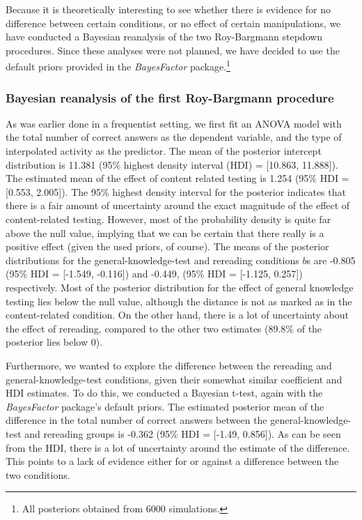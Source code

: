 \documentclass[11pt,]{article}
\let\rmarkdownfootnote\footnote%
\def\footnote{\protect\rmarkdownfootnote}
\begin{document}
Because it is theoretically interesting to see whether there is evidence
for no difference between certain conditions, or no effect of certain
manipulations, we have conducted a Bayesian reanalysis of the two
Roy-Bargmann stepdown procedures. Since these analyses were not planned,
we have decided to use the default priors provided in the
\textit{BayesFactor} \citep{moreyBayesFactorComputationBayes2018}
package.\footnote{All posteriors obtained from 6000 simulations.}

\hypertarget{bayesian-reanalysis-of-the-first-roy-bargmann-procedure}{%
\subsubsection{Bayesian reanalysis of the first Roy-Bargmann
procedure}\label{bayesian-reanalysis-of-the-first-roy-bargmann-procedure}}

As was earlier done in a frequentist setting, we first fit an ANOVA
model with the total number of correct answers as the dependent
variable, and the type of interpolated activity as the predictor. The
mean of the posterior intercept distribution is 11.381 (95\% highest
density interval (HDI) = {[}10.863, 11.888{]}). The estimated mean of
the effect of content related testing is 1.254 (95\% HDI = {[}0.553,
2.005{]}). The 95\% highest density interval for the posterior indicates
that there is a fair amount of uncertainty around the exact magnitude of
the effect of content-related testing. However, most of the probability
density is quite far above the null value, implying that we can be
certain that there really is a positive effect (given the used priors,
of course). The means of the posterior distributions for the
general-knowledge-test and rereading conditions \(b\)s are -0.805 (95\%
HDI = {[}-1.549, -0.116{]}) and -0.449, (95\% HDI = {[}-1.125, 0.257{]})
respectively. Most of the posterior distribution for the effect of
general knowledge testing lies below the null value, although the
distance is not as marked as in the content-related condition. On the
other hand, there is a lot of uncertainty about the effect of rereading,
compared to the other two estimates (89.8\% of the posterior lies below
0).

Furthermore, we wanted to explore the difference between the rereading
and general-knowledge-test conditions, given their somewhat similar
coefficient and HDI estimates. To do this, we conducted a Bayesian
t-test, again with the \textit{BayesFactor} package's default priors.
The estimated posterior mean of the difference in the total number of
correct answers between the general-knowledge-test and rereading groups
is -0.362 (95\% HDI = {[}-1.49, 0.856{]}). As can be seen from the HDI,
there is a lot of uncertainty around the estimate of the difference.
This points to a lack of evidence either for or against a difference
between the two conditions.
\end{document}
